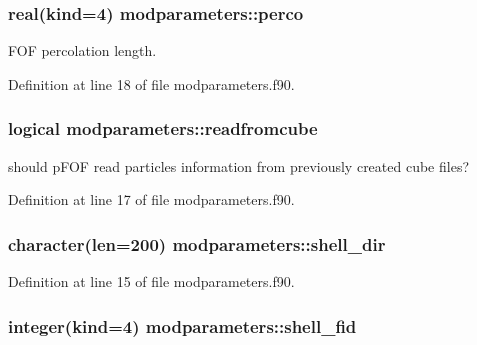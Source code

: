 \hypertarget{classmodparameters_a555c497cb7980e89a34876df62f2b22b}{
\subsubsection[{perco}]{\setlength{\rightskip}{0pt plus 5cm}real(kind=4) modparameters\-::perco}}\label{classmodparameters_a555c497cb7980e89a34876df62f2b22b}


F\-O\-F percolation length. 



Definition at line 18 of file modparameters.\-f90.

\hypertarget{classmodparameters_aef43d9e55952a11ab38b7ec4b793eeee}{
\subsubsection[{readfromcube}]{\setlength{\rightskip}{0pt plus 5cm}logical modparameters\-::readfromcube}}\label{classmodparameters_aef43d9e55952a11ab38b7ec4b793eeee}


should p\-F\-O\-F read particles information from previously created cube files? 



Definition at line 17 of file modparameters.\-f90.

\hypertarget{classmodparameters_adb57a3540b1d0caa308f50ac8f56d99f}{
\subsubsection[{shell\-\_\-dir}]{\setlength{\rightskip}{0pt plus 5cm}character(len=200) modparameters\-::shell\-\_\-dir}}\label{classmodparameters_adb57a3540b1d0caa308f50ac8f56d99f}


Definition at line 15 of file modparameters.\-f90.

\hypertarget{classmodparameters_ab8116a893043284dd7f4c7d54d179af6}{
\subsubsection[{shell\-\_\-fid}]{\setlength{\rightskip}{0pt plus 5cm}integer(kind=4) modparameters\-::shell\-\_\-fid}}\label{classmodparameters_ab8116a893043284dd7f4c7d54d179af6}


